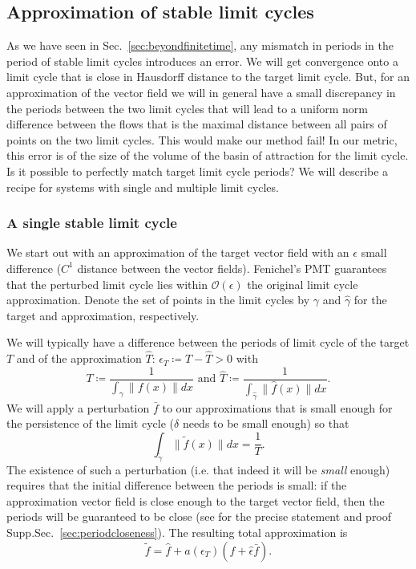 \documentclass{article}
\theoremstyle{definition}
\theoremstyle{remark}
\newcounter{ct}
\begin{document}
\subsection{Approximation of stable limit cycles}\label{sec:lc_approx}
As we have seen in Sec.~\ref{sec:beyondfinitetime}, any mismatch in periods in the period of stable limit cycles introduces an error.
We will get convergence onto a limit cycle that is close in Hausdorff distance to the target limit cycle. %
But, for an approximation of the vector field we will in general have a small discrepancy in the periods between the two limit cycles that will lead to a uniform norm difference between the flows that is the maximal distance between all pairs of points on the two limit cycles.
This would make our method fail!
In our metric, this error is of the size of the volume of the basin of attraction for the limit cycle.
Is it possible to perfectly match target limit cycle periods?
We will describe a recipe for systems with single and multiple limit cycles.


\subsubsection{A single stable limit cycle}
We start out with an approximation of the target vector field with an $\epsilon$ small difference ($C^1$ distance between the vector fields).
Fenichel's PMT guarantees that the perturbed limit cycle lies within $\mathcal{O}(\epsilon)$ the original limit cycle approximation.
Denote the set of points in the limit cycles by $\gamma$ and $\hat\gamma$ for the target and approximation, respectively.

We will typically have a difference between the periods of limit cycle of the target $T$ and of the approximation $\hat T$: $\epsilon_T\coloneqq T-\hat T>0$
with \[T\coloneqq\frac{1}{\int_{\gamma}\|f(x)\|dx} \text{ and } \hat T\coloneqq\frac{1}{\int_{\hat{\gamma}}\|\hat f(x)\|dx}.\]
%
We will apply a perturbation $\bar{f}$ to our approximations that is small enough for the persistence of the limit cycle ($\delta$ needs to be small enough) 
so that 
\begin{equation}\label{eq:lc_constraint}
\int_{\tilde{\gamma}}\|\tilde{f}(x)\| dx = \frac{1}{T}. 	%
\end{equation}
The existence of such a perturbation (i.e. that indeed it will be \emph{small} enough) requires that the initial difference between the periods is small:
if the approximation vector field is close enough to the target vector field, then the periods will be guaranteed to be close (see for the precise statement and proof Supp.Sec.~\ref{sec:periodcloseness}).
The resulting total approximation is 
\begin{equation}\label{eq:lc_correction}\tilde{f}=%
 \hat{f} + a(\epsilon_T)(\hat{f} + \hat{\epsilon}\bar{f}).
 \end{equation}
\end{document}
